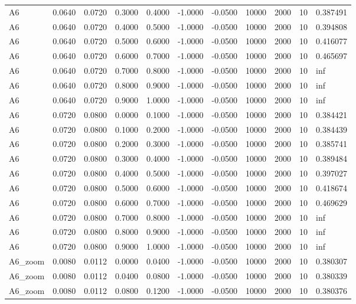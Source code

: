 \documentclass{article}
\begin{document}
\begin{longtable}{l r r r r r r r r r l}
A6 & 0.0640 & 0.0720 & 0.3000 & 0.4000 & -1.0000 & -0.0500 & 10000 & 2000 & 10 & 0.387491 \\
A6 & 0.0640 & 0.0720 & 0.4000 & 0.5000 & -1.0000 & -0.0500 & 10000 & 2000 & 10 & 0.394808 \\
A6 & 0.0640 & 0.0720 & 0.5000 & 0.6000 & -1.0000 & -0.0500 & 10000 & 2000 & 10 & 0.416077 \\
A6 & 0.0640 & 0.0720 & 0.6000 & 0.7000 & -1.0000 & -0.0500 & 10000 & 2000 & 10 & 0.465697 \\
A6 & 0.0640 & 0.0720 & 0.7000 & 0.8000 & -1.0000 & -0.0500 & 10000 & 2000 & 10 & inf \\
A6 & 0.0640 & 0.0720 & 0.8000 & 0.9000 & -1.0000 & -0.0500 & 10000 & 2000 & 10 & inf \\
A6 & 0.0640 & 0.0720 & 0.9000 & 1.0000 & -1.0000 & -0.0500 & 10000 & 2000 & 10 & inf \\
A6 & 0.0720 & 0.0800 & 0.0000 & 0.1000 & -1.0000 & -0.0500 & 10000 & 2000 & 10 & 0.384421 \\
A6 & 0.0720 & 0.0800 & 0.1000 & 0.2000 & -1.0000 & -0.0500 & 10000 & 2000 & 10 & 0.384439 \\
A6 & 0.0720 & 0.0800 & 0.2000 & 0.3000 & -1.0000 & -0.0500 & 10000 & 2000 & 10 & 0.385741 \\
A6 & 0.0720 & 0.0800 & 0.3000 & 0.4000 & -1.0000 & -0.0500 & 10000 & 2000 & 10 & 0.389484 \\
A6 & 0.0720 & 0.0800 & 0.4000 & 0.5000 & -1.0000 & -0.0500 & 10000 & 2000 & 10 & 0.397027 \\
A6 & 0.0720 & 0.0800 & 0.5000 & 0.6000 & -1.0000 & -0.0500 & 10000 & 2000 & 10 & 0.418674 \\
A6 & 0.0720 & 0.0800 & 0.6000 & 0.7000 & -1.0000 & -0.0500 & 10000 & 2000 & 10 & 0.469629 \\
A6 & 0.0720 & 0.0800 & 0.7000 & 0.8000 & -1.0000 & -0.0500 & 10000 & 2000 & 10 & inf \\
A6 & 0.0720 & 0.0800 & 0.8000 & 0.9000 & -1.0000 & -0.0500 & 10000 & 2000 & 10 & inf \\
A6 & 0.0720 & 0.0800 & 0.9000 & 1.0000 & -1.0000 & -0.0500 & 10000 & 2000 & 10 & inf \\
A6_zoom & 0.0080 & 0.0112 & 0.0000 & 0.0400 & -1.0000 & -0.0500 & 10000 & 2000 & 10 & 0.380307 \\
A6_zoom & 0.0080 & 0.0112 & 0.0400 & 0.0800 & -1.0000 & -0.0500 & 10000 & 2000 & 10 & 0.380339 \\
A6_zoom & 0.0080 & 0.0112 & 0.0800 & 0.1200 & -1.0000 & -0.0500 & 10000 & 2000 & 10 & 0.380376 \\

\end{longtable}
\end{document}
